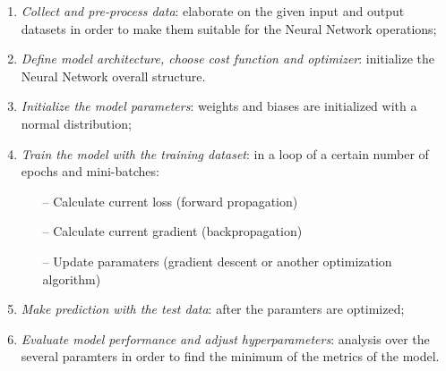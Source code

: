 \documentclass[english,notitlepage,reprint,nofootinbib]{revtex4-1}  %
\begin{document}
\begin{enumerate}
    \item \textit{Collect and pre-process data}: elaborate on the given input and output datasets in order to make them suitable for the Neural Network operations;
    \item \textit{Define model architecture, choose cost function and optimizer}: initialize the Neural Network overall structure.
    \item \textit{Initialize the model parameters}: weights and biases are initialized with a normal distribution;
    \item \textit{Train the model with the training dataset}: in a loop of a certain number of epochs and mini-batches:
    \begin{itemize}
        \item[–] Calculate current loss (forward propagation)
        \item[–] Calculate current gradient (backpropagation)
        \item[–] Update paramaters (gradient descent or another optimization algorithm)
    \end{itemize}
    \item \textit{Make prediction with the test data}: after the paramters are optimized;
    \item \textit{Evaluate model performance and adjust hyperparameters}: analysis over the several paramters in order to find the minimum of the metrics of the model.
\end{enumerate}
\end{document}
